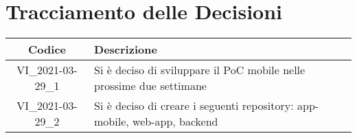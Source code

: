 \section*{Tracciamento delle Decisioni}

\begin{center}
	\begin{longtable}{|c|p{13cm}|}
	\hline
	\rowcolor{lighter-grayer}
	\textbf{Codice} & \textbf{Descrizione} \\
	\hline
	\endfirsthead

	\hline
	VI\_2021-03-29\_1 & Si è deciso di sviluppare il PoC mobile nelle prossime due settimane \\
	VI\_2021-03-29\_2 & Si è deciso di creare i seguenti repository: app-mobile, web-app, backend   \\
	\hline

	\end{longtable}
\end{center}